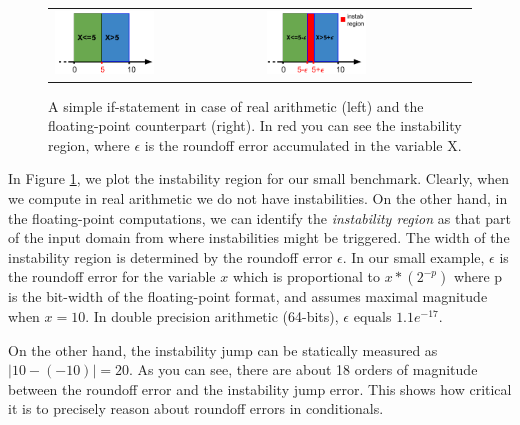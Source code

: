 \begin{figure}[h!]
	\centering
	\begin{tabular}{ll}
		\includegraphics[width=0.5\textwidth]{pic/ifreal.png}
		&
		\includegraphics[width=0.5\textwidth]{pic/iffp.png}
	\end{tabular}
	\caption{A simple if-statement in case of real arithmetic (left) and the floating-point counterpart (right). In red you can see the instability region, where $\epsilon$ is the roundoff error accumulated in the variable X.}
	\label{fig:ifreal}
\end{figure}

In Figure \ref{fig:ifreal}, we plot the instability region for our small benchmark. Clearly, when we compute in real arithmetic we do not have instabilities. On the other hand, in the floating-point computations, we can identify the \emph{instability region} as that part of the input domain from where instabilities might be triggered.
%
The width of the instability region is determined by the roundoff error $\epsilon$.
%
In our small example, $\epsilon$ is the roundoff error for the variable $x$ which is proportional to $x*(2^{-p})$ where p is the bit-width of the floating-point format, and assumes maximal magnitude when $x=10$.  
%
In double precision arithmetic (64-bits), $\epsilon$ equals $1.1e^{-17}$.
%

On the other hand, the instability jump can be statically measured as $|10-(-10)|=20$. As you can see, there are about 18 orders of magnitude between the roundoff error and the instability jump error.
%
This shows how critical it is to precisely reason about roundoff errors in conditionals.
 
